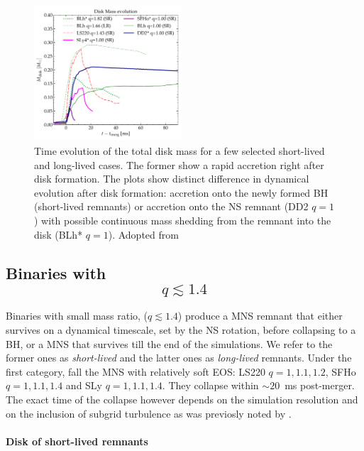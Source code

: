 \documentclass[11pt,a4paper,headinclude=true,DIV=14,BCOR=8mm,chapterprefix,listof=totoc,twoside,openright,abstracton]{scrbook}
\newcommand{\pmerg}{post-merger}
\begin{document}
\begin{figure}[t]
    \centering 
    \includegraphics[width=0.49\textwidth]{./figs/disk/total_disk_mass_evo.pdf}
    \caption{Time evolution of the total disk mass for a few selected
        short-lived and long-lived cases. The former show a rapid 
        accretion right after disk formation. The plots show
        distinct difference in dynamical evolution after disk formation: accretion onto
        the newly formed BH (short-lived remnants) or accretion onto the NS
        remnant (DD2 $q=1$) with possible continuous mass shedding from the remnant
        into the disk (BLh* $q=1$). Adopted from \citet{Nedora:2020pak}
    } 
    \label{fig:disk_mass_evo}
\end{figure}


\subsection{Binaries with $$q\lesssim1.4$$}


Binaries with small mass ratio, ($q\lesssim1.4$) produce a \ac{MNS} remnant
that either survives on a dynamical timescale, set by the \ac{NS} rotation, before
collapsing to a \ac{BH}, or a \ac{MNS} that survives till the end of the simulations.
We refer to the former ones as \textit{short-lived} and the latter ones as 
\textit{long-lived} remnants.
Under the first category, fall the \ac{MNS} with relatively soft \ac{EOS}:
LS220 $q=1,1.1,1.2$, SFHo $q=1,1.1,1.4$ and SLy $q=1,1.1,1.4$. 
They collapse within $\sim20$~ms \pmerg. 
The exact time of the collapse however depends on the simulation resolution 
and on the inclusion of subgrid turbulence as was previosly noted by \citet{Radice:2017zta}.

\paragraph{Disk of short-lived remnants}
\end{document}
